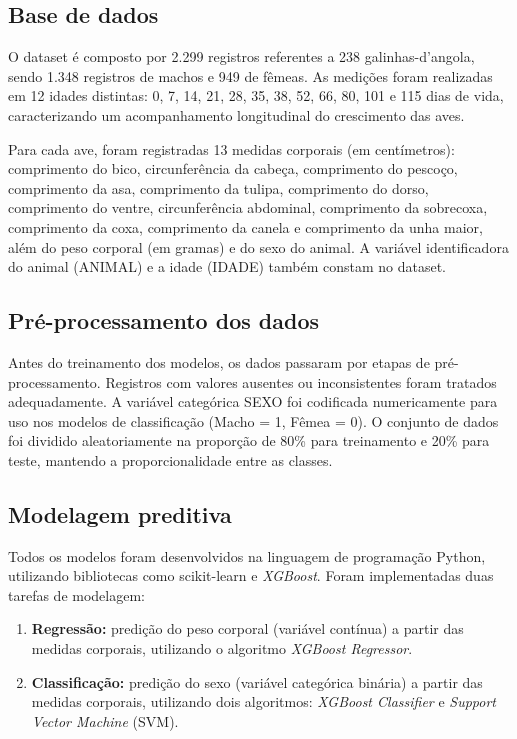 \documentclass[12pt]{article}
\begin{document}
\subsection{Base de dados}

O dataset é composto por 2.299 registros referentes a 238 galinhas-d'angola,
sendo 1.348 registros de machos e 949 de fêmeas. As medições foram realizadas
em 12 idades distintas: 0, 7, 14, 21, 28, 35, 38, 52, 66, 80, 101 e 115 dias de
vida, caracterizando um acompanhamento longitudinal do crescimento das aves.

Para cada ave, foram registradas 13 medidas corporais (em centímetros):
comprimento do bico, circunferência da cabeça, comprimento do pescoço,
comprimento da asa, comprimento da tulipa, comprimento do dorso, comprimento do
ventre, circunferência abdominal, comprimento da sobrecoxa, comprimento da
coxa, comprimento da canela e comprimento da unha maior, além do peso corporal
(em gramas) e do sexo do animal. A variável identificadora do animal (ANIMAL) e
a idade (IDADE) também constam no dataset.

\subsection{Pré-processamento dos dados}

Antes do treinamento dos modelos, os dados passaram por etapas de
pré-processamento. Registros com valores ausentes ou inconsistentes foram
tratados adequadamente. A variável categórica SEXO foi codificada numericamente
para uso nos modelos de classificação (Macho = 1, Fêmea = 0). O conjunto de
dados foi dividido aleatoriamente na proporção de 80\% para treinamento e 20\%
para teste, mantendo a proporcionalidade entre as classes.

\subsection{Modelagem preditiva}

Todos os modelos foram desenvolvidos na linguagem de programação Python,
utilizando bibliotecas como scikit-learn e \textit{XGBoost}. Foram
implementadas duas tarefas de modelagem:

\begin{enumerate}
  \item \textbf{Regressão:} predição do peso corporal (variável contínua) a
    partir das medidas corporais, utilizando o algoritmo \textit{XGBoost
    Regressor}.
  \item \textbf{Classificação:} predição do sexo (variável categórica binária)
    a partir das medidas corporais, utilizando dois algoritmos:
    \textit{XGBoost Classifier} e \textit{Support Vector Machine} (SVM).
\end{enumerate}
\end{document}
